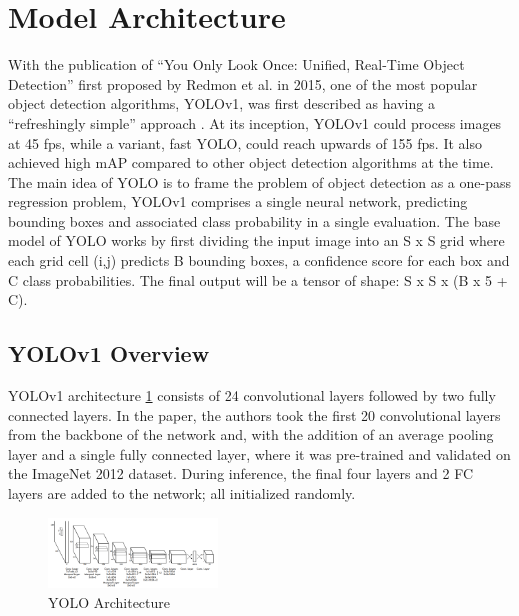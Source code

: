 \documentclass[10pt,twocolumn,letterpaper]{article}
\begin{document}

\section{Model Architecture}
With the publication of “You Only Look Once: Unified, Real-Time Object Detection” first proposed by Redmon et al.\cite{YOLO_OG} in 2015, one of the most popular object detection algorithms, YOLOv1, was first described as having a “refreshingly simple” approach \cite{CompReview}. At its inception, YOLOv1 could process images at 45 fps, while a variant, fast YOLO, could reach upwards of 155 fps. It also achieved high mAP compared to other object detection algorithms at the time.\\
\indent The main idea of YOLO is to frame the problem of object detection as a one-pass regression problem, YOLOv1 comprises a single neural network, predicting bounding boxes and associated class probability in a single evaluation. The base model of YOLO works by first dividing the input image into an S x S grid where each grid cell (i,j) predicts B bounding boxes, a confidence score for each box and C class probabilities. The final output will be a tensor of shape: S x S x (B x 5 + C).

\subsection{YOLOv1 Overview}
YOLOv1 architecture \ref{fig:YOLOv1Architecture} consists of 24 convolutional layers followed by two fully connected layers. In the paper, the authors took the first 20 convolutional layers from the backbone of the network and, with the addition of an average pooling layer and a single fully connected layer, where it was pre-trained and validated on the ImageNet 2012 dataset. During inference, the final four layers and 2 FC layers are added to the network; all initialized randomly.

\begin{figure}[h]
    \centering
    \includegraphics[width=0.4\textwidth]{figures/YOLOv1 Architecture.png}
    \caption{YOLO Architecture \cite{YOLO_OG}}
    \label{fig:YOLOv1Architecture}
\end{figure}
\end{document}
